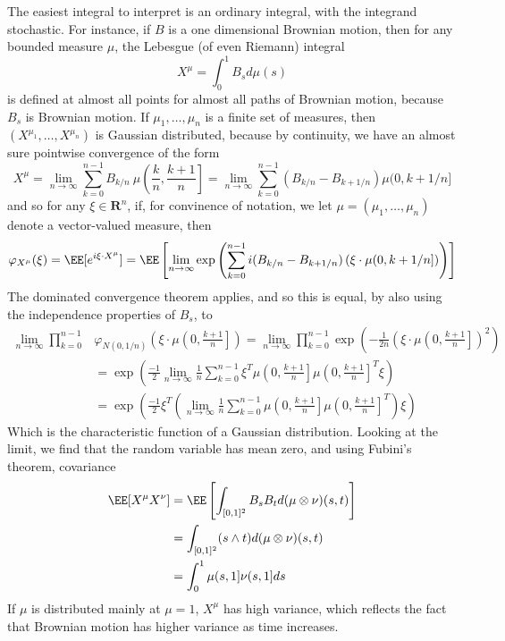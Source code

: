 \begin{example}
    The easiest integral to interpret is an ordinary integral, with the integrand stochastic. For instance, if $B$ is a one dimensional Brownian motion, then for any bounded measure $\mu$, the Lebesgue (of even Riemann) integral
    \[ X^\mu = \int_0^1 B_s d\mu(s) \]
    is defined at almost all points for almost all paths of Brownian motion, because $B_s$ is Brownian motion. If $\mu_1, \dots, \mu_n$ is a finite set of measures, then $(X^{\mu_1}, \dots, X^{\mu_n})$ is Gaussian distributed, because by continuity, we have an almost sure pointwise convergence of the form
    \[ X^\mu = \lim_{n \to \infty} \sum_{k = 0}^{n-1} B_{k/n}\ \mu \left( \frac{k}{n}, \frac{k+1}{n} \right] = \lim_{n \to \infty} \sum_{k = 0}^{n-1} (B_{k/n} - B_{k+1/n}) \mu (0, k+1/n] \]
    and so for any $\xi \in \mathbf{R}^n$, if, for convinence of notation, we let $\mu = (\mu_1, \dots, \mu_n)$ denote a vector-valued measure, then
    \[ \varphi_{X^\mu}(\xi) = \EE[e^{i \xi \cdot X^\mu}] = \EE \left[ \lim_{n \to \infty} \exp \left( \sum_{k = 0}^{n-1} i (B_{k/n} - B_{k+1/n}) \left( \xi \cdot \mu(0,k+1/n] \right) \right) \right] \]
    The dominated convergence theorem applies, and so this is equal, by also using the independence properties of $B_s$, to
    \begin{align*}
        \lim_{n \to \infty} \prod_{k = 0}^{n-1} & \varphi_{N(0,1/n)} \left(\xi \cdot \mu \left(0, \frac{k+1}{n} \right] \right) = \lim_{n \to \infty} \prod_{k = 0}^{n-1} \exp \left( - \frac{1}{2n} \left(\xi \cdot \mu \left(0, \frac{k+1}{n} \right] \right)^2 \right)\\
        &= \exp \left( \frac{-1}{2} \lim_{n \to \infty} \frac{1}{n} \sum_{k = 0}^{n-1} \xi^T \mu \left(0, \frac{k+1}{n} \right] \mu \left(0, \frac{k+1}{n} \right]^T \xi \right)\\
        &= \exp \left( \frac{-1}{2} \xi^T \left( \lim_{n \to \infty} \frac{1}{n} \sum_{k = 0}^{n-1} \mu \left(0, \frac{k+1}{n} \right] \mu \left(0, \frac{k+1}{n} \right]^T \right) \xi \right)
    \end{align*}
    Which is the characteristic function of a Gaussian distribution. Looking at the limit, we find that the random variable has mean zero, and using Fubini's theorem, covariance
    \begin{align*}
        \EE[X^\mu X^\nu] &= \EE \left[ \int_{[0,1]^2} B_sB_t d(\mu \otimes \nu)(s,t) \right]\\
        &= \int_{[0,1]^2} (s \wedge t) d(\mu \otimes \nu)(s,t)\\
        &= \int_0^1 \mu(s,1] \nu(s,1] ds
    \end{align*}
    If $\mu$ is distributed mainly at $\mu = 1$, $X^\mu$ has high variance, which reflects the fact that Brownian motion has higher variance as time increases.
\end{example}

